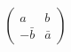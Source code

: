 \begin{equation}
  \label{eq:su2}
  \begin{pmatrix}
    a & b \\ - \bar b & \bar a
  \end{pmatrix}
\end{equation}

